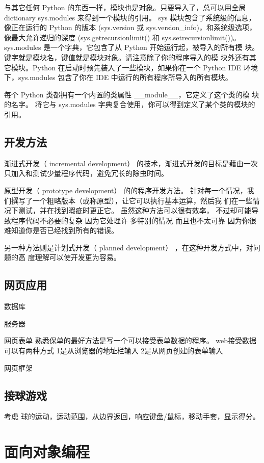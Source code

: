 \documentclass[twoside,11pt]{book}
\begin{document}
与其它任何 Python 的东西一样，模块也是对象。只要导入了，总可以用全局 dictionary sys.modules 来得到一个模块的引用。
sys 模块包含了系统级的信息，像正在运行的 Python 的版本 (sys.version 或
sys.version\_info)，和系统级选项，像最大允许递归的深度 (sys.getrecursionlimit() 和 sys.setrecursionlimit())。
sys.modules 是一个字典，它包含了从 Python 开始运行起，被导入的所有模 块。键字就是模块名，键值就是模块对象。请注意除了你的程序导入的模 块外还有其它模块。Python 在启动时预先装入了一些模块，如果你在一个 Python IDE 环境下，sys.modules 包含了你在 IDE 中运行的所有程序所导入的所有模块。

每个 Python 类都拥有一个内置的类属性 \_\_module\_\_，它定义了这个类的模 块的名字。
将它与 sys.modules 字典复合使用，你可以得到定义了某个类的模块的引用。


\subsection{开发方法}
渐进式开发（ incremental development）
的技术，渐进式开发的目标是藉由一次只加入和测试少量程序代码，避免冗长的除虫时间。

原型开发（ prototype development） 的的程序开发方法。
针对每一个情况，我们撰写了一个粗略版本（或称原型），让它可以执行基本运算，然后我
们在一些情况下测试，并在找到暇疵时更正它。
虽然这种方法可以很有效率， 不过却可能导致程序代码不必要的复杂 因为它处理许
多特别的情况 而且也不太可靠 因为你很难知道你是否已经找到所有的错误。


另一种方法则是计划式开发（ planned development） ，在这种开发方式中，对问题的高
度理解可以使开发更为容易。

\subsection{网页应用}
数据库

服务器

网页表单
熟悉保单的最好方法是写一个可以接受表单数据的程序。
web接受数据可以有两种方式
1是从浏览器的地址栏输入
2是从网页创建的表单输入


网页框架


\subsection{接球游戏}

考虑 球的运动，运动范围，从边界返回，响应键盘/鼠标，移动手套，显示得分。

\section{面向对象编程}
\end{document}
